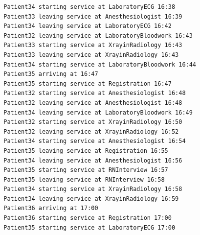 \documentclass[12pt]{article}
\begin{document}
\begin{verbatim}
		Patient34 starting service at LaboratoryECG 16:38
		Patient33 leaving service at Anesthesiologist 16:39
		Patient34 leaving service at LaboratoryECG 16:42
		Patient32 leaving service at LaboratoryBloodwork 16:43
		Patient33 starting service at XrayinRadiology 16:43
		Patient33 leaving service at XrayinRadiology 16:43
		Patient34 starting service at LaboratoryBloodwork 16:44
		Patient35 arriving at 16:47
		Patient35 starting service at Registration 16:47
		Patient32 starting service at Anesthesiologist 16:48
		Patient32 leaving service at Anesthesiologist 16:48
		Patient34 leaving service at LaboratoryBloodwork 16:49
		Patient32 starting service at XrayinRadiology 16:50
		Patient32 leaving service at XrayinRadiology 16:52
		Patient34 starting service at Anesthesiologist 16:54
		Patient35 leaving service at Registration 16:55
		Patient34 leaving service at Anesthesiologist 16:56
		Patient35 starting service at RNInterview 16:57
		Patient35 leaving service at RNInterview 16:58
		Patient34 starting service at XrayinRadiology 16:58
		Patient34 leaving service at XrayinRadiology 16:59
		Patient36 arriving at 17:00
		Patient36 starting service at Registration 17:00
		Patient35 starting service at LaboratoryECG 17:00
		\end{verbatim}
		
\end{document}
